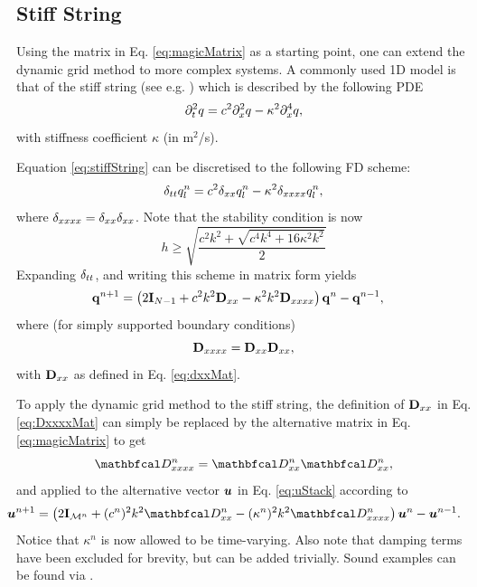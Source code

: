 \documentclass[fleqn]{jaes}
\begin{document}
\subsection{Stiff String}\label{sec:stiffString}
Using the matrix in Eq. \eqref{eq:magicMatrix} as a starting point, one can extend the dynamic grid method to more complex systems. A commonly used 1D model is that of the stiff string (see e.g. \cite{Webb2015, Bilbao2019, Willemsen2019}) which is described by the following PDE \cite{Bilbao2009}
\begin{equation}\label{eq:stiffString}
    \ptt q = c^2 \pxx q - \kappa^2 \pxxxx q,
\end{equation} 
with stiffness coefficient $\kappa$ (in m$^2$/s).

Equation \eqref{eq:stiffString} can be discretised to the following FD scheme:
\begin{equation}
    \delta_{tt} q_l^n = c^2 \delta_{xx} q_l^n - \kappa^2 \delta_{xxxx} q_l^n,
\end{equation}
where $\delta_{xxxx} = \delta_{xx}\delta_{xx}$. Note that the stability condition is now
\begin{equation}
    h \geq \sqrt{\frac{c^2k^2 + \sqrt{c^4k^4+16\kappa^2k^2}}{2}}
\end{equation} 
Expanding $\delta_{tt}$, and writing this scheme in matrix form yields
\begin{equation}\label{eq:stiffStringDynMatrix}
    \!\!\!\!\!\!\q^{n+1} = \left(2\I_{N-1} + c^2 k^2 \Dxx - \kappa^2 k^2 \Dxxxx\right)\q^{n} - \q^{n-1},
\end{equation}
where (for simply supported boundary conditions)
\begin{equation}\label{eq:DxxxxMat}
    \Dxxxx = \Dxx\Dxx,
\end{equation}
with $\mathbf{D}_{xx}$ as defined in Eq. \eqref{eq:dxxMat}.

To apply the dynamic grid method to the stiff string, the definition of $\mathbf{D}_{xx}$ in Eq. \eqref{eq:DxxxxMat} can simply be replaced by the alternative matrix in Eq. \eqref{eq:magicMatrix} to get
\begin{equation}
    \DDxxxx = \DDxx\DDxx,
\end{equation}
and applied to the alternative vector $\boldsymbol{u}$ in Eq. \eqref{eq:uStack} according to
\begin{equation}
    \!\!\!\!\!\!\!\!\!\uStack^{n+1} = \left(2\I_\MoneD + (c^n)^2k^2\DDxx - (\kappa^n)^2k^2\DDxxxx\right)\uStack^n - \uStack^{n-1}.
\end{equation}
Notice that $\kappa^n$ is now allowed to be time-varying. Also note that damping terms have been excluded for brevity, but can be added trivially. Sound examples can be found via \cite{soundExamples}.
\end{document}
